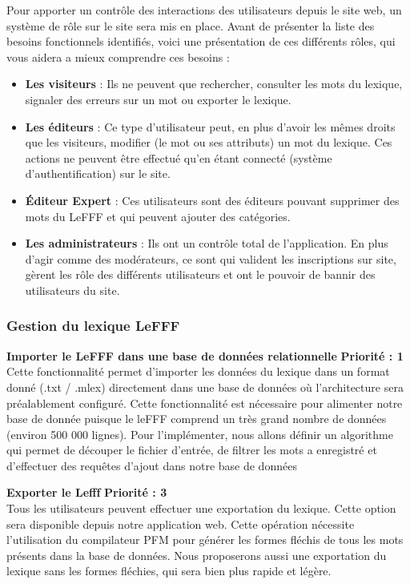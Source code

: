 \documentclass[12pt,a4paper]{article}
\begin{document}
\smallbreak Pour apporter un contrôle des interactions des utilisateurs depuis le site web, un système de rôle sur le site sera mis en place. Avant de présenter la liste des besoins fonctionnels identifiés, voici une présentation de ces différents rôles, qui vous aidera a mieux comprendre ces besoins : 
\begin{itemize}  
  \item \textbf{Les visiteurs} : Ils ne peuvent que rechercher, consulter les mots du lexique, signaler des erreurs sur un mot ou exporter le lexique.
  \item \textbf{Les éditeurs} : Ce type d'utilisateur peut, en plus d'avoir les mêmes droits que les visiteurs, modifier (le mot ou ses attributs) un mot du lexique. Ces actions ne peuvent être effectué qu'en étant connecté (système d'authentification) sur le site.
  \item \textbf{Éditeur Expert} :  Ces utilisateurs sont des éditeurs pouvant supprimer des mots du LeFFF et qui peuvent ajouter des catégories.
  \item \textbf{Les administrateurs} : Ils ont un contrôle total de l'application. En plus d'agir comme des modérateurs, ce sont qui valident les inscriptions sur site, gèrent les rôle des différents utilisateurs et ont le pouvoir de bannir des utilisateurs du site.
\end{itemize}
 \subsubsection{Gestion du lexique LeFFF}
\textbf{Importer le LeFFF dans une base de données relationnelle}
\textbf{Priorité : 1} \\ 
Cette fonctionnalité permet d'importer les données du lexique dans un format donné (.txt / .mlex) directement dans une base de données où l'architecture sera préalablement configuré.
Cette fonctionnalité est nécessaire pour alimenter notre base de donnée puisque le leFFF comprend un très grand nombre de données (environ 500 000 lignes).
Pour l'implémenter, nous allons définir un algorithme qui permet de découper le fichier d'entrée, de filtrer les mots a enregistré et d'effectuer des requêtes d'ajout dans notre base de données

 \textbf{ Exporter le Lefff}
\textbf{Priorité : 3}  \\
Tous les utilisateurs peuvent effectuer une exportation du lexique. Cette option sera disponible depuis notre application web. Cette opération nécessite l'utilisation du compilateur PFM pour générer les formes fléchis de tous les mots présents dans la base de données.
Nous proposerons aussi une exportation du lexique sans les formes fléchies, qui sera bien plus rapide et légère.
\end{document}
